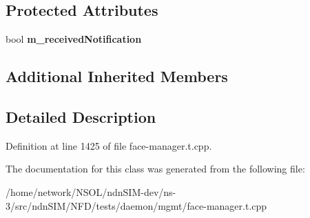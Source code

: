 \subsection*{Protected Attributes}
\begin{DoxyCompactItemize}
\item 
bool {\bfseries m\+\_\+received\+Notification}\hypertarget{classnfd_1_1tests_1_1FaceFixture_ad3a550c6fc7904709f5bce947441276d}{}\label{classnfd_1_1tests_1_1FaceFixture_ad3a550c6fc7904709f5bce947441276d}

\end{DoxyCompactItemize}
\subsection*{Additional Inherited Members}


\subsection{Detailed Description}


Definition at line 1425 of file face-\/manager.\+t.\+cpp.



The documentation for this class was generated from the following file\+:\begin{DoxyCompactItemize}
\item 
/home/network/\+N\+S\+O\+L/ndn\+S\+I\+M-\/dev/ns-\/3/src/ndn\+S\+I\+M/\+N\+F\+D/tests/daemon/mgmt/face-\/manager.\+t.\+cpp\end{DoxyCompactItemize}

